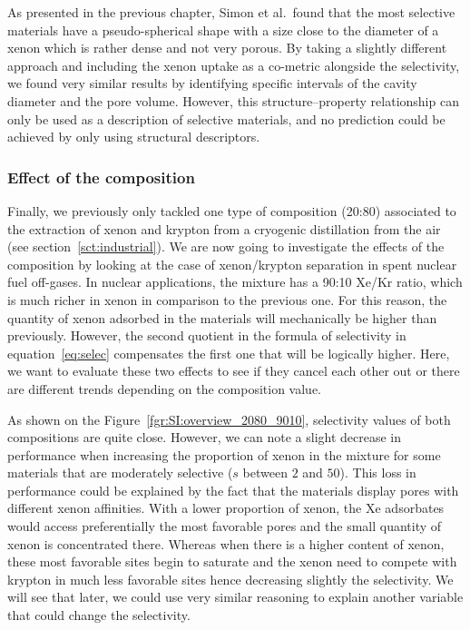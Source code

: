 \documentclass[main.tex]{subfiles}
\begin{document}
As presented in the previous chapter, Simon et al.\ found that the most selective materials have a pseudo-spherical shape with a size close to the diameter of a xenon which is rather dense and not very porous. By taking a slightly different approach and including the xenon uptake as a co-metric alongside the selectivity, we found very similar results by identifying specific intervals of the cavity diameter and the pore volume. However, this structure--property relationship can only be used as a description of selective materials, and no prediction could be achieved by only using structural descriptors. 

\subsubsection{Effect of the composition}

Finally, we previously only tackled one type of composition (20:80) associated to the extraction of xenon and krypton from a cryogenic distillation from the air (see section~\ref{sct:industrial}). We are now going to investigate the effects of the composition by looking at the case of xenon/krypton separation in spent nuclear fuel off-gases. In nuclear applications, the mixture has a 90:10 Xe/Kr ratio, which is much richer in xenon in comparison to the previous one. For this reason, the quantity of xenon adsorbed in the materials will mechanically be higher than previously. However, the second quotient in the formula of selectivity in equation~\ref{eq:selec} compensates the first one that will be logically higher. Here, we want to evaluate these two effects to see if they cancel each other out or there are different trends depending on the composition value. 

As shown on the Figure~\ref{fgr:SI:overview_2080_9010}, selectivity values of both compositions are quite close. However, we can note a slight decrease in performance when increasing the proportion of xenon in the mixture for some materials that are moderately selective ($s$ between $2$ and $50$). This loss in performance could be explained by the fact that the materials display pores with different xenon affinities. With a lower proportion of xenon, the Xe adsorbates would access preferentially the most favorable pores and the small quantity of xenon is concentrated there. Whereas when there is a higher content of xenon, these most favorable sites begin to saturate and the xenon need to compete with krypton in much less favorable sites hence decreasing slightly the selectivity. We will see that later, we could use very similar reasoning to explain another variable that could change the selectivity.
\end{document}
